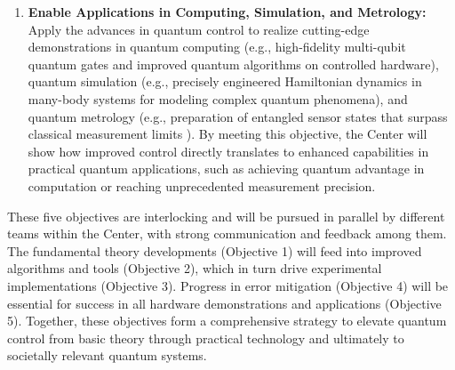 \documentclass[11pt]{article}
\begin{document}
\begin{enumerate}
   \item \textbf{Enable Applications in Computing, Simulation, and Metrology:} Apply the advances in quantum control to realize cutting-edge demonstrations in quantum computing (e.g., high-fidelity multi-qubit quantum gates and improved quantum algorithms on controlled hardware), quantum simulation (e.g., precisely engineered Hamiltonian dynamics in many-body systems for modeling complex quantum phenomena), and quantum metrology (e.g., preparation of entangled sensor states that surpass classical measurement limits \cite{Giovannetti04}). By meeting this objective, the Center will show how improved control directly translates to enhanced capabilities in practical quantum applications, such as achieving quantum advantage in computation or reaching unprecedented measurement precision.
\end{enumerate}

These five objectives are interlocking and will be pursued in parallel by different teams within the Center, with strong communication and feedback among them. The fundamental theory developments (Objective 1) will feed into improved algorithms and tools (Objective 2), which in turn drive experimental implementations (Objective 3). Progress in error mitigation (Objective 4) will be essential for success in all hardware demonstrations and applications (Objective 5). Together, these objectives form a comprehensive strategy to elevate quantum control from basic theory through practical technology and ultimately to societally relevant quantum systems.
\end{document}
